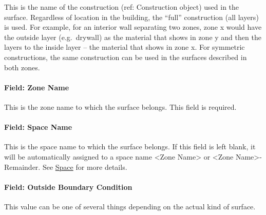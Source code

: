 This is the name of the construction (ref: Construction object) used in the surface. Regardless of location in the building, the ``full'' construction (all layers) is used. For example, for an interior wall separating two zones, zone x would have the outside layer (e.g.~drywall) as the material that shows in zone y and then the layers to the inside layer -- the material that shows in zone x. For symmetric constructions, the same construction can be used in the surfaces described in both zones.

\paragraph{Field: Zone Name}\label{field-zone-name-13}

This is the zone name to which the surface belongs. This field is required.

\paragraph{Field: Space Name}\label{field-space-name-13}

This is the space name to which the surface belongs. If this field is left blank, it will be automatically assigned to a space name <Zone Name> or <Zone Name>-Remainder. See \hyperref[space]{Space} for more details.

\paragraph{Field: Outside Boundary Condition}\label{field-outside-boundary-condition-3}

This value can be one of several things depending on the actual kind of surface.

